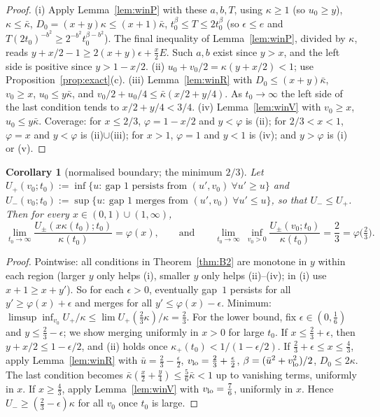 \documentclass[11pt]{article}
\newtheorem{corollary}[theorem]{Corollary}
\theoremstyle{definition}
\theoremstyle{remark}
\begin{document}
\begin{proof}
(i) Apply Lemma~\ref{lem:winP} with these $a,b,T$, using $\kappa\ge1$ (so $u_0\ge y$), $\kappa\le\bar\kappa$,
$D_0=(x+y)\kappa\le(x+1)\bar\kappa$, $t_0^\beta\le T\le2t_0^\beta$ (so $\epsilon\le e$ and
$T(2t_0)^{-b^2}\ge2^{-b^2}t_0^{\beta-b^2}$). The final inequality of Lemma~\ref{lem:winP}, divided by $\kappa$,
reads $y+x/2-1\ge2(x+y)\epsilon+\frac x2E$. Such $a,b$ exist since $y>x$, and the left side is positive since
$y>1-x/2$.
(ii) $u_0+v_0/2=\kappa(y+x/2)<1$; use Proposition~\ref{prop:exact}(c).
(iii) Lemma~\ref{lem:winR} with $D_0\le(x+y)\bar\kappa$, $v_0\ge x$, $u_0\le y\bar\kappa$, and
$v_0/2+u_0/4\le\bar\kappa(x/2+y/4)$. As $t_0\to\infty$ the left side of the last condition tends to
$x/2+y/4<3/4$.
(iv) Lemma~\ref{lem:winV} with $v_0\ge x$, $u_0\le y\bar\kappa$.
Coverage: for $x\le2/3$, $\varphi=1-x/2$ and $y<\varphi$ is (ii); for $2/3<x<1$, $\varphi=x$ and $y<\varphi$ is
(ii)$\cup$(iii); for $x>1$, $\varphi=1$ and $y<1$ is (iv); and $y>\varphi$ is (i) or (v).
\end{proof}

\begin{corollary}[normalised boundary; the minimum $2/3$]\label{cor:B2}
Let $U_+(v_0;t_0):=\inf\{u:\ \text{gap 1 persists from }(u',v_0)\ \forall u'\ge u\}$ and
$U_-(v_0;t_0):=\sup\{u:\ \text{gap 1 merges from }(u',v_0)\ \forall u'\le u\}$, so that $U_-\le U_+$. Then for every
$x\in(0,1)\cup(1,\infty)$,
\[
\lim_{t_0\to\infty}\frac{U_\pm(x\kappa(t_0);t_0)}{\kappa(t_0)}=\varphi(x),\qquad\text{and}\qquad
\lim_{t_0\to\infty}\ \inf_{v_0>0}\frac{U_\pm(v_0;t_0)}{\kappa(t_0)}=\frac23=\varphi\big(\tfrac23\big).
\]
\end{corollary}
\begin{proof}
Pointwise: all conditions in Theorem~\ref{thm:B2} are monotone in $y$ within each region (larger $y$ only helps
(i), smaller $y$ only helps (ii)--(iv); in (i) use $x+1\ge x+y'$). So for each $\epsilon>0$, eventually gap~$1$
persists for all $y'\ge\varphi(x)+\epsilon$ and merges for all $y'\le\varphi(x)-\epsilon$.
Minimum: $\limsup\inf_{v_0}U_+/\kappa\le\lim U_+(\frac23\kappa)/\kappa=\frac23$. For the lower bound, fix
$\epsilon\in(0,\frac16)$ and $y\le\frac23-\epsilon$; we show merging uniformly in $x>0$ for large $t_0$.
If $x\le\frac23+\epsilon$, then $y+x/2\le1-\epsilon/2$, and (ii) holds once $\kappa_+(t_0)<1/(1-\epsilon/2)$.
If $\frac23+\epsilon\le x\le\frac43$, apply Lemma~\ref{lem:winR} with $\bar u=\frac23-\frac\epsilon2$,
$v_{\rm lo}=\frac23+\frac\epsilon2$, $\beta=(\bar u^2+v_{\rm lo}^2)/2$, $D_0\le2\kappa$. The last condition becomes
$\bar\kappa(\frac x2+\frac y4)\le\frac56\bar\kappa<1$ up to vanishing terms, uniformly in $x$. If $x\ge\frac43$,
apply Lemma~\ref{lem:winV} with $v_{\rm lo}=\frac76$, uniformly in $x$. Hence $U_-\ge(\frac23-\epsilon)\kappa$
for all $v_0$ once $t_0$ is large.
\end{proof}
\end{document}
